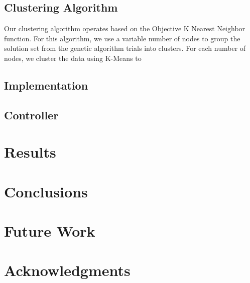 \documentclass{sig-alternate}
\begin{document}
\subsection{Clustering Algorithm}
Our clustering algorithm operates based on the Objective K Nearest Neighbor function. For this algorithm, we use a variable number of nodes to group the 
solution set from the genetic algorithm trials into clusters. For each number of nodes, we cluster the data using K-Means to 

\subsection{Implementation}

\subsection{Controller}

\section{Results}

\section{Conclusions}

\section{Future Work}

\section{Acknowledgments}

\cite{salas:calculus}

%

\end{document}

